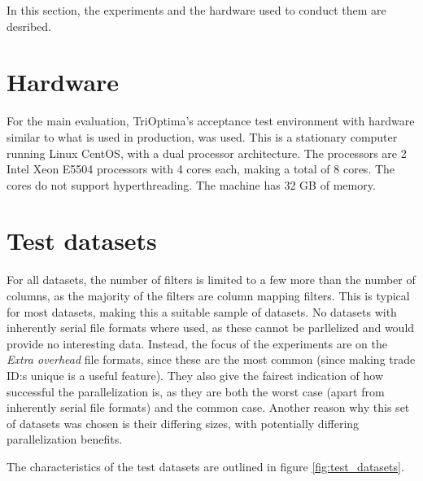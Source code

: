 In this section, the experiments and the hardware used to conduct them are desribed.

\section{Hardware}
For the main evaluation, TriOptima’s acceptance test environment with hardware similar to what is used in production, was used. This is a stationary computer running Linux CentOS,
with a dual processor architecture. The processors are 2 Intel Xeon E5504 processors with 4 cores each, making a total of 8 cores. The cores do not support hyperthreading. The machine
has 32 GB of memory.

\section{Test datasets}
For all datasets, the number of filters is limited to a few more than the number of columns, as the majority of the filters are column mapping filters.
This is typical for most datasets, making this a suitable sample of datasets. No datasets with inherently serial file formats where used, as these cannot be
parllelized and would provide no interesting data. Instead, the focus of the experiments are on the \textit{Extra overhead} file formats, since these are the
most common (since making trade ID:s unique is a useful feature). They also give the fairest indication of how successful the parallelization is, as they are
both the worst case (apart from inherently serial file formats) and the common case. Another reason why this set of datasets was chosen is their differing sizes,
with potentially differing parallelization benefits.

The characteristics of the test datasets are outlined in figure \ref{fig:test_datasets}.

